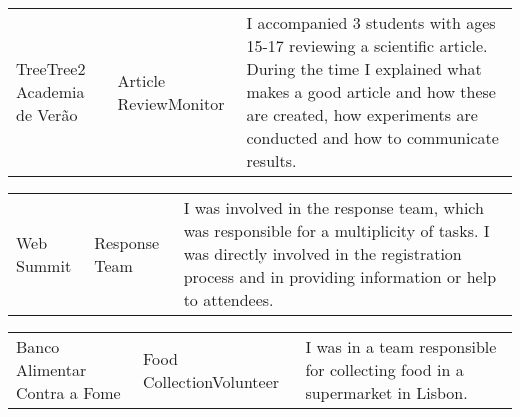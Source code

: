 \vspace{7pt}

\begin{tabular*}{1\textwidth}{p{} p{} p{9.8cm} }
	\textcolor{accent}{TreeTree2 \newline Academia de Verão} & 
	\textcolor{bgcol}{Article Review\newline Monitor} & 
	I accompanied 3 students with ages 15-17 reviewing a scientific article. 
	During the time I explained what makes a good article and how 
	these are created, how experiments are conducted and how to communicate results. \\
\end{tabular*}
\vspace{4pt}
\begin{tabular*}{1\textwidth}{p{} p{} p{9.8cm} }
	\textcolor{accent}{Web Summit} & \textcolor{bgcol}{Response Team} & 
	I was involved in the response team, which was responsible for a multiplicity of tasks. I was directly involved in the registration process and in providing information or help to attendees. \\
\end{tabular*}
\vspace{4pt}
\begin{tabular*}{1\textwidth}{p{} p{} p{9.8cm} }
	\textcolor{accent}{Banco Alimentar \newline Contra a Fome} & 
	\textcolor{bgcol}{Food Collection\newline Volunteer} & 
	I was in a team responsible for collecting food in a supermarket in Lisbon. \\
\end{tabular*}